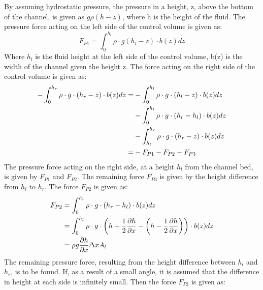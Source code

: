 By assuming hydrostatic pressure, the pressure in a height, z, above the bottom of the channel, is given as $g\rho(h-z)$, where h is the height of the fluid.  
The pressure force acting on the left side of the control volume is given as:
\begin{equation}\label{eq:P1}
	F_{P1} = \int_{0}^{h_l} \rho \cdot g (h_l - z)\cdot b(z) dz
\end{equation}
Where $h_l$ is the fluid height at the left side of the control volume, b(z) is the width of the channel given the height z. The force acting on the right side of the control volume is given as:
\begin{equation}\label{eq:P2}
\begin{aligned}
	-\int_{0}^{h_r} \rho \cdot g \cdot(h_r - z)\cdot b(z)dz = 
	&-\int_{0}^{h_l} \rho \cdot g \cdot(h_l - z)\cdot b(z)dz \vspace{2mm}\\ 
	&-\int_{0}^{h_l} \rho \cdot g \cdot(h_r- h_l)\cdot b(z)dz \vspace{2mm}\\
	&-\int_{h_l}^{h_r} \rho \cdot g \cdot(h_r - z)\cdot b(z)dz \vspace{4mm}\\
	=&-F_{P1} - F_{P2} - F_{P3}
\end{aligned}	
\end{equation}
The pressure force acting on the right side, at a height $h_l$ from the channel bed, is given by $F_{P1}$ and $F_{P2}$. The remaining force $F_{P3}$ is given by the height difference from $h_l$ to $h_r$. The force $F_{P2}$ is given as:
\begin{equation}
\begin{aligned}
	F_{P2} &= \int_{0}^{h_l} \rho \cdot g \cdot (h_r - h_l)\cdot b(z)dz \vspace{2mm}\\
	&=  \int_{0}^{h_l} \rho \cdot g \cdot \left(h + \frac{1}{2} \frac{\partial h}{\partial x} - \left(h - \frac{1}{2} \frac{\partial h}{\partial x}\right)\right)\cdot b(z)dz \vspace{2mm}\\
	&= \rho g \frac{\partial h}{\partial x}\Delta x A_l
\end{aligned}
\end{equation}
The remaining pressure force, resulting from the height difference between $h_l$ and $h_r$, is to be found. If, as a result of a small angle, it is assumed that the difference in height at each side is infinitely small. Then the force $F_{P3}$ is given as:
